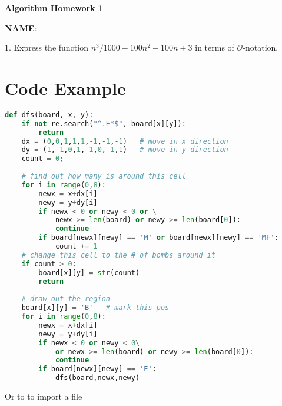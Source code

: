 \documentclass[12pt]{article}
\newcommand{\bigO}{\mathcal{O}}
\begin{document}
\begin{center}
    \textbf{Algorithm Homework 1}
\end{center}


\textbf{NAME}: 

1. Express the function $n^3/1000 - 100n^2 -100n + 3$ in terms of $\bigO$-notation.

\section*{Code Example}

\begin{lstlisting}[language=Python, caption=Python example]
def dfs(board, x, y):
    if not re.search("^.E*$", board[x][y]):
        return
    dx = (0,0,1,1,1,-1,-1,-1)   # move in x direction
    dy = (1,-1,0,1,-1,0,-1,1)   # move in y direction
    count = 0;
    
    # find out how many is around this cell
    for i in range(0,8):
        newx = x+dx[i]
        newy = y+dy[i]
        if newx < 0 or newy < 0 or \
            newx >= len(board) or newy >= len(board[0]):
            continue
        if board[newx][newy] == 'M' or board[newx][newy] == 'MF':
            count += 1
    # change this cell to the # of bombs around it
    if count > 0:
        board[x][y] = str(count)
        return
    
    # draw out the region
    board[x][y] = 'B'   # mark this pos
    for i in range(0,8):
        newx = x+dx[i]
        newy = y+dy[i]
        if newx < 0 or newy < 0\
            or newx >= len(board) or newy >= len(board[0]):
            continue
        if board[newx][newy] == 'E':
            dfs(board,newx,newy)
\end{lstlisting}

Or to to import a file


\end{document}
